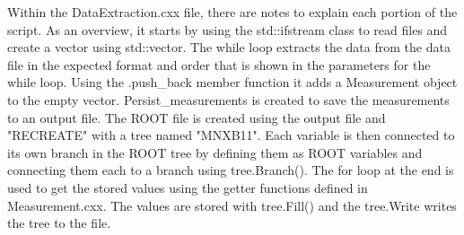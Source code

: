 Within the DataExtraction.cxx file, there are notes to explain each portion of the script. As an
overview, it starts by using the std::ifstream class to read files and create a vector using std::vector.
The while loop extracts the data from the data file in the expected format and order that is shown in
the parameters for the while loop. Using the .push_back member function it adds a Measurement
object to the empty vector. Persist_measurements is created to save the measurements to an
output file. The ROOT file is created using the output file and "RECREATE" with a tree named
"MNXB11". Each variable is then connected to its own branch in the ROOT tree by defining them
as ROOT variables and connecting them each to a branch using tree.Branch(). The for loop at the
end is used to get the stored values using the getter functions defined in Measurement.cxx. The
values are stored with tree.Fill() and the tree.Write writes the tree to the file.
